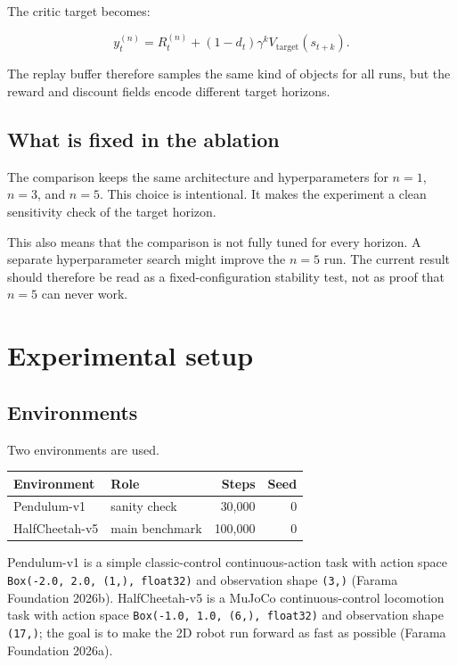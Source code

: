 \documentclass[
  american,
]{article}
\begin{document}
The critic target becomes:

\[
y_t^{(n)} = R_t^{(n)} + (1-d_t) \gamma^k V_{\text{target}}(s_{t+k}).
\]

The replay buffer therefore samples the same kind of objects for all
runs, but the reward and discount fields encode different target
horizons.

\subsection{What is fixed in the
ablation}\label{what-is-fixed-in-the-ablation}

The comparison keeps the same architecture and hyperparameters for
\(n=1\), \(n=3\), and \(n=5\). This choice is intentional. It makes the
experiment a clean sensitivity check of the target horizon.

\begin{notegray}
This also means that the comparison is not fully tuned for every horizon. A separate hyperparameter search might improve the $n=5$ run. The current result should therefore be read as a fixed-configuration stability test, not as proof that $n=5$ can never work.
\end{notegray}

\section{Experimental setup}\label{experimental-setup}

\subsection{Environments}\label{environments}

Two environments are used.

\begin{longtable}[]{@{}llrr@{}}
\toprule\noalign{}
Environment & Role & Steps & Seed \\
\midrule\noalign{}
\endhead
\bottomrule\noalign{}
\endlastfoot
Pendulum-v1 & sanity check & 30,000 & 0 \\
HalfCheetah-v5 & main benchmark & 100,000 & 0 \\
\end{longtable}

Pendulum-v1 is a simple classic-control continuous-action task with
action space \texttt{Box(-2.0,\ 2.0,\ (1,),\ float32)} and observation
shape \texttt{(3,)} (Farama Foundation 2026b). HalfCheetah-v5 is a
MuJoCo continuous-control locomotion task with action space
\texttt{Box(-1.0,\ 1.0,\ (6,),\ float32)} and observation shape
\texttt{(17,)}; the goal is to make the 2D robot run forward as fast as
possible (Farama Foundation 2026a).
\end{document}
